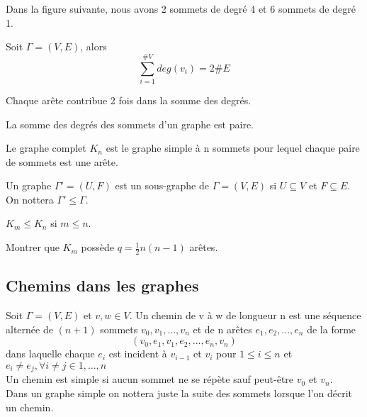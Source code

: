 \begin{exmp}
Dans la figure suivante, nous avons 2 sommets de degré 4 et 6 sommets de degré 1.
\end{exmp}



\begin{thrm}
Soit $\Gamma = (V,E)$, alors $$\sum_{i=1}^{\#V} deg(v_{i}) = 2\#E$$
\end{thrm}

\begin{demo}
Chaque arête contribue 2 fois dans la somme des degrés.
\end{demo}

\begin{corll}
La somme des degrés des sommets d'un graphe est paire. \\
\end{corll}

\begin{defn}
Le graphe complet $K_{n}$ est le graphe simple à n sommets pour lequel chaque paire de sommets est une arête.
\end{defn}

\begin{exmp}
	
\end{exmp}

\begin{defn}
Un graphe ${\Gamma}'=(U,F)$ est un sous-graphe de $\Gamma=(V,E)$ si $ U \subseteq V$ et $F \subseteq E$. On nottera $ {\Gamma}' \leq \Gamma$.
\end{defn}

\begin{exmp}
$ K_{m} \leq K_{n}$ si $ m \leq n$.
\end{exmp}

\begin{exo}
Montrer que $K_{m}$ possède $ q=\frac{1}{2}n(n-1)$ arêtes.
\end{exo}


\subsection{Chemins dans les graphes}

\begin{defn}
Soit $\Gamma = (V,E)$ et $v,w \in V$. Un chemin de v à w de longueur n est une séquence alternée de $(n+1)$ sommets $v_{0},v_{1},...,v_{n}$ et de n arêtes $e_{1},e_{2},...,e_{n}$ de la forme $$ (v_{0},e_{1},v_{1},e_{2},...,e_{n},v_{n})$$ dans laquelle chaque $e_{i}$ est incident à $v_{i-1}$ et $v_{i}$ pour $1 \leq i \leq n$ et $ e_{i} \neq e_{j} , \forall i \neq j \in 1,...,n$ \\

Un chemin est simple si aucun sommet ne se répète sauf peut-être $v_{0}$ et $v_{n}$. \\

Dans un graphe simple on nottera juste la suite des sommets lorsque l'on décrit un chemin. \\

\end{defn}


